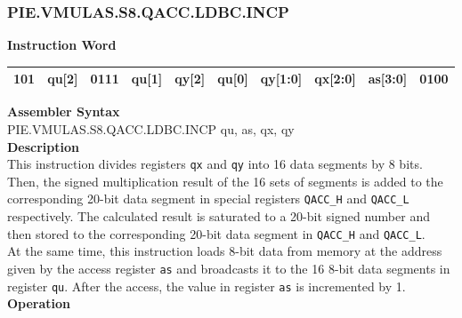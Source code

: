 \newpage
\subsubsection{PIE.VMULAS.S8.QACC.LDBC.INCP}\label{instruction:PIEVMULASS8QACCLDBCINCP}
\setlength\tabcolsep{6pt}
\textbf{Instruction Word} \\
\begin{tabular}{|c|c|c|c|c|c|c|c|c|c|}
	\hline
	101 & qu[2] & 0111 & qu[1] & qy[2] & qu[0] & qy[1:0] & qx[2:0] & as[3:0] & 0100 \\
	\hline
\end{tabular}

\textbf{Assembler Syntax} \\
PIE.VMULAS.S8.QACC.LDBC.INCP qu, as, qx, qy \\
\textbf{Description} \\
This instruction divides registers \lstinline{qx} and \lstinline{qy} into 16 data segments by 8 bits. Then, the signed multiplication result of the 16 sets of segments is added to the corresponding 20-bit data segment in special registers \lstinline{QACC_H} and \lstinline{QACC_L} respectively. The calculated result is saturated to a 20-bit signed number and then stored to the corresponding 20-bit data segment in \lstinline{QACC_H} and \lstinline{QACC_L}.\\
At the same time, this instruction loads 8-bit data from memory at the address given by the access register \lstinline{as} and broadcasts it to the 16 8-bit data segments in register \lstinline{qu}. After the access, the value in register \lstinline{as} is incremented by 1.\\
\textbf{Operation}
